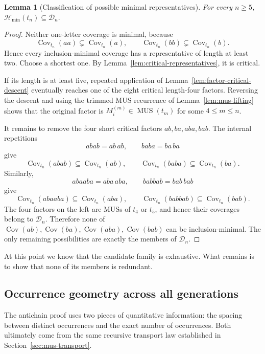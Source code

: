 \documentclass[10pt,a4paper]{article}
\newtheorem{lemma}[theorem]{Lemma}
\theoremstyle{definition}\newtheorem{definition}[theorem]{Definition}
\theoremstyle{remark}\newtheorem{remark}[theorem]{Remark}
\newcommand{\Cov}{\operatorname{Cov}}
\newcommand{\MUS}{\operatorname{MUS}}
\newcommand{\Hmin}{\mathcal{H}_{\min}}
\begin{document}
\begin{lemma}[Classification of possible minimal representatives]
\label{lem:possible-minimal-representatives}
For every $n\ge5$,
$
 \Hmin(t_n)\subseteq\mathcal D_n.
$
\end{lemma}

\begin{proof}
Neither one-letter coverage is minimal, because
\[
 \Cov_{t_n}(aa)\subsetneq\Cov_{t_n}(a),
 \qquad
 \Cov_{t_n}(bb)\subsetneq\Cov_{t_n}(b).
\]
Hence every inclusion-minimal coverage has a representative of length at least two.  Choose a shortest one.  By Lemma~\ref{lem:critical-representatives}, it is critical.

If its length is at least five, repeated application of Lemma~\ref{lem:factor-critical-descent} eventually reaches one of the eight critical length-four factors.  Reversing the descent and using the trimmed MUS recurrence of Lemma~\ref{lem:mus-lifting} shows that the original factor is $M_i^{(m)}\in\MUS(t_m)$ for some $4\le m\le n$.

It remains to remove the four short critical factors $ab,ba,aba,bab$.  The internal repetitions
\[
 abab=ab\,ab,
 \qquad
 baba=ba\,ba
\]
give
\[
 \Cov_{t_n}(abab)\subseteq\Cov_{t_n}(ab),
 \qquad
 \Cov_{t_n}(baba)\subseteq\Cov_{t_n}(ba).
\]
Similarly,
\[
 abaaba=aba\,aba,
 \qquad
 babbab=bab\,bab
\]
give
\[
 \Cov_{t_n}(abaaba)\subseteq\Cov_{t_n}(aba),
 \qquad
 \Cov_{t_n}(babbab)\subseteq\Cov_{t_n}(bab).
\]
The four factors on the left are MUSs of $t_4$ or $t_5$, and hence their coverages belong to $\mathcal D_n$.  Therefore none of $\Cov(ab),\Cov(ba),\Cov(aba),\Cov(bab)$ can be inclusion-minimal.  The only remaining possibilities are exactly the members of $\mathcal D_n$.
\end{proof}

At this point we know that the candidate family is exhaustive.  What remains is to show that none of its members is redundant.

\subsection{Occurrence geometry across all generations}
\label{subsec:all-generation-geometry}

The antichain proof uses two pieces of quantitative information: the spacing between distinct occurrences and the exact number of occurrences.  Both ultimately come from the same recursive transport law established in Section~\ref{sec:mus-transport}.
\end{document}
